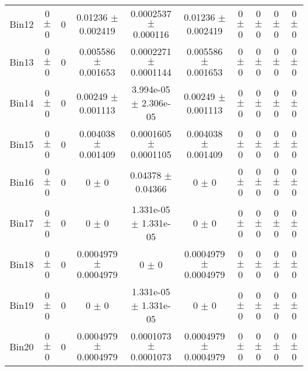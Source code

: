 \begin{tabular}{@{\extracolsep{4pt}}lccccccccc@{}}
     Bin12 & 0 $\pm$ 0 & 0 & 0.01236 $\pm$ 0.002419 & 0.0002537 $\pm$ 0.000116 & 0.01236 $\pm$ 0.002419 & 0 $\pm$ 0 & 0 $\pm$ 0 & 0 $\pm$ 0 & 0 $\pm$ 0 \\ 
     Bin13 & 0 $\pm$ 0 & 0 & 0.005586 $\pm$ 0.001653 & 0.0002271 $\pm$ 0.0001144 & 0.005586 $\pm$ 0.001653 & 0 $\pm$ 0 & 0 $\pm$ 0 & 0 $\pm$ 0 & 0 $\pm$ 0 \\ 
     Bin14 & 0 $\pm$ 0 & 0 & 0.00249 $\pm$ 0.001113 & 3.994e-05 $\pm$ 2.306e-05 & 0.00249 $\pm$ 0.001113 & 0 $\pm$ 0 & 0 $\pm$ 0 & 0 $\pm$ 0 & 0 $\pm$ 0 \\ 
     Bin15 & 0 $\pm$ 0 & 0 & 0.004038 $\pm$ 0.001409 & 0.0001605 $\pm$ 0.0001105 & 0.004038 $\pm$ 0.001409 & 0 $\pm$ 0 & 0 $\pm$ 0 & 0 $\pm$ 0 & 0 $\pm$ 0 \\ 
     Bin16 & 0 $\pm$ 0 & 0 & 0 $\pm$ 0 & 0.04378 $\pm$ 0.04366 & 0 $\pm$ 0 & 0 $\pm$ 0 & 0 $\pm$ 0 & 0 $\pm$ 0 & 0 $\pm$ 0 \\ 
     Bin17 & 0 $\pm$ 0 & 0 & 0 $\pm$ 0 & 1.331e-05 $\pm$ 1.331e-05 & 0 $\pm$ 0 & 0 $\pm$ 0 & 0 $\pm$ 0 & 0 $\pm$ 0 & 0 $\pm$ 0 \\ 
     Bin18 & 0 $\pm$ 0 & 0 & 0.0004979 $\pm$ 0.0004979 & 0 $\pm$ 0 & 0.0004979 $\pm$ 0.0004979 & 0 $\pm$ 0 & 0 $\pm$ 0 & 0 $\pm$ 0 & 0 $\pm$ 0 \\ 
     Bin19 & 0 $\pm$ 0 & 0 & 0 $\pm$ 0 & 1.331e-05 $\pm$ 1.331e-05 & 0 $\pm$ 0 & 0 $\pm$ 0 & 0 $\pm$ 0 & 0 $\pm$ 0 & 0 $\pm$ 0 \\ 
     Bin20 & 0 $\pm$ 0 & 0 & 0.0004979 $\pm$ 0.0004979 & 0.0001073 $\pm$ 0.0001073 & 0.0004979 $\pm$ 0.0004979 & 0 $\pm$ 0 & 0 $\pm$ 0 & 0 $\pm$ 0 & 0 $\pm$ 0 \\ 
\hline\hline
  \end{tabular}
